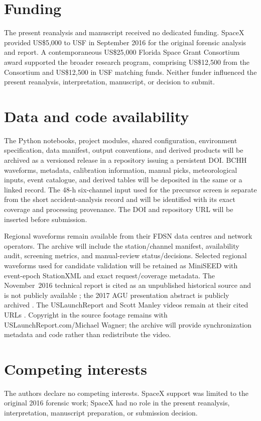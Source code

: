 \documentclass[]{seismica}
\begin{document}
\section*{Funding}

The present reanalysis and manuscript received no dedicated funding. SpaceX
provided US\$5,000 to USF in September 2016 for the original forensic analysis
and report. A contemporaneous US\$25,000 Florida Space Grant Consortium award
supported the broader research program, comprising US\$12,500 from the
Consortium and US\$12,500 in USF matching funds. Neither funder influenced the
present reanalysis, interpretation, manuscript, or decision to submit.

\section*{Data and code availability}

The Python notebooks, project modules, shared configuration, environment
specification, data manifest, output conventions, and derived products will be
archived as a versioned release in a repository issuing a persistent DOI. BCHH
waveforms, metadata, calibration information, manual picks, meteorological
inputs, event catalogue, and derived tables will be deposited in the same or a
linked record. The 48-h six-channel input used for the precursor screen is
separate from the short accident-analysis record and will be identified with
its exact coverage and processing provenance. The DOI and repository URL will be inserted before submission.

Regional waveforms remain available from their FDSN data centres and network
operators. The archive will include the station/channel manifest, availability
audit, screening metrics, and manual-review status/decisions. Selected regional
waveforms used for candidate validation will be retained as MiniSEED with
event-epoch StationXML and exact request/coverage metadata. The November~2016
technical report is cited as an unpublished historical source and is not
publicly available \citep{thompson_mcnutt_fireball_2016}; the 2017 AGU
presentation abstract is publicly archived \citep{thompson_agu_falcon9_2017}. The USLaunchReport and
Scott Manley videos remain at their cited URLs
\citep{uslaunchreport_amos6_video_2016,manley_spacex_explosion_2016}. Copyright
in the source footage remains with USLaunchReport.com/Michael Wagner; the
archive will provide synchronization metadata and code rather than redistribute
the video.

\section*{Competing interests}

The authors declare no competing interests. SpaceX support was limited to the
original 2016 forensic work; SpaceX had no role in the present reanalysis,
interpretation, manuscript preparation, or submission decision.


\end{document}
